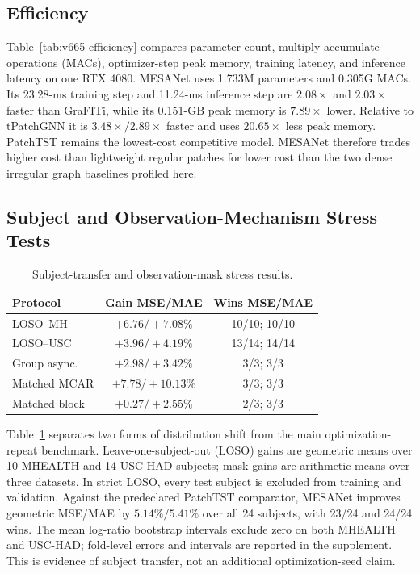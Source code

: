 \subsection{Efficiency}



Table~\ref{tab:v665-efficiency} compares parameter count, multiply-accumulate
operations (MACs), optimizer-step
peak memory, training latency, and inference latency on one RTX 4080. MESANet
uses 1.733M parameters and 0.305G MACs. Its
23.28-ms training step and 11.24-ms inference step are $2.08\times$ and
$2.03\times$ faster than GraFITi, while its 0.151-GB peak memory is
$7.89\times$ lower. Relative to tPatchGNN it is $3.48\times/2.89\times$
faster and uses $20.65\times$ less peak memory.
PatchTST remains the lowest-cost competitive model. MESANet therefore trades
higher cost than lightweight regular patches for lower cost than the two dense
irregular graph baselines profiled here.

\subsection{Subject and Observation-Mechanism Stress Tests}

\begin{table}[t]
\centering
\setlength{\tabcolsep}{3.0pt}
\caption{Subject-transfer and observation-mask stress results.}
\label{tab:v671-stress}
\begin{tabular}{@{}p{}cc@{}}
\toprule
Protocol & Gain MSE/MAE & Wins MSE/MAE \\
\midrule
LOSO--MH & $+6.76/+7.08\%$ & 10/10; 10/10 \\
LOSO--USC & $+3.96/+4.19\%$ & 13/14; 14/14 \\
Group async. & $+2.98/+3.42\%$ & 3/3; 3/3 \\
Matched MCAR & $+7.78/+10.13\%$ & 3/3; 3/3 \\
Matched block & $+0.27/+2.55\%$ & 2/3; 3/3 \\
\bottomrule
\end{tabular}
\end{table}

Table~\ref{tab:v671-stress} separates two forms of distribution shift from the
main optimization-repeat benchmark. Leave-one-subject-out (LOSO) gains are
geometric means over 10
MHEALTH and 14 USC-HAD subjects; mask gains are arithmetic means over three
datasets. In strict LOSO, every test subject is
excluded from training and validation. Against the predeclared PatchTST
comparator, MESANet improves geometric MSE/MAE by $5.14\%/5.41\%$ over all 24
subjects, with 23/24 and 24/24 wins. The mean log-ratio bootstrap intervals
exclude zero on both MHEALTH and USC-HAD; fold-level errors and intervals are
reported in the supplement. This is evidence of subject transfer, not an
additional optimization-seed claim.


